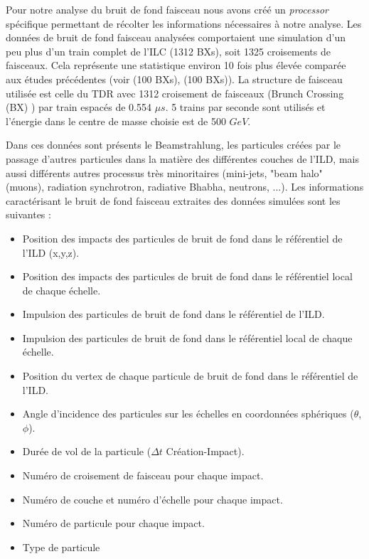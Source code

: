   \medskip

  Pour notre analyse du bruit de fond faisceau nous avons cr\'e\'e un \textit{processor} sp\'ecifique permettant de r\'ecolter les informations n\'ecessaires \`a notre analyse. Les donn\'ees de bruit de fond faisceau analys\'ees comportaient une simulation d'un peu plus d'un train complet de l'ILC (1312 BXs), soit 1325 croisements de faisceaux. Cela repr\'esente une statistique environ 10 fois plus \'elev\'ee compar\'ee aux \'etudes pr\'ec\'edentes (voir \cite{DeMasi:2009ym} (100 BXs), \cite{Vogel:2008zza} (100 BXs)). La structure de faisceau utilis\'ee est celle du TDR avec 1312 croisement de faisceaux (Brunch Crossing (BX) ) par train espac\'es de 0.554 $\mu s$. 5 trains par seconde sont utilis\'es et l'\'energie dans le centre de masse choisie est de 500 $GeV$.
  
  \medskip
  
  Dans ces donn\'ees sont pr\'esents le Beamstrahlung, les particules cr\'e\'ees par le passage d'autres particules dans la mati\`ere des diff\'erentes couches de l'ILD, mais aussi diff\'erents autres processus tr\`es minoritaires (mini-jets, "beam halo" (muons), radiation synchrotron, radiative Bhabha, neutrons, ...). Les informations caract\'erisant le bruit de fond faisceau extraites des donn\'ees simul\'ees sont les suivantes :

  \medskip

  \renewcommand{\labelitemi}{$\bullet$}
  \begin{itemize}
  \item Position des impacts des particules de bruit de fond dans le r\'ef\'erentiel de l'ILD (x,y,z).
  \item Position des impacts des particules de bruit de fond dans le r\'ef\'erentiel local de chaque \'echelle.
  \item Impulsion des particules de bruit de fond dans le r\'ef\'erentiel de l'ILD.
  \item Impulsion des particules de bruit de fond dans le r\'ef\'erentiel local de chaque \'echelle.
  \item Position du vertex de chaque particule de bruit de fond dans le r\'ef\'erentiel de l'ILD.
  \item Angle d'incidence des particules sur les \'echelles en coordonn\'ees sph\'eriques ($\theta$, $\phi$).
  \item Dur\'ee de vol de la particule ($\Delta t$ Cr\'eation-Impact).
  \item Num\'ero de croisement de faisceau pour chaque impact.
  \item Num\'ero de couche et num\'ero d'\'echelle pour chaque impact.
  \item Num\'ero de particule pour chaque impact.
  \item Type de particule
  \end{itemize}

